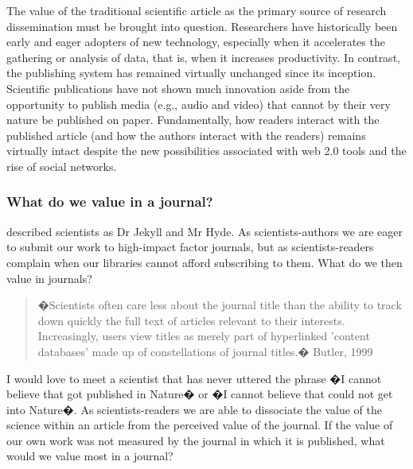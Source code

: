 \documentclass[final,authoryear,3p]{elsarticle-open-drafting}
\begin{document}
The value of the traditional scientific article as the primary source of research dissemination must be brought into question. 
Researchers have historically been early and eager adopters of new technology, especially when it accelerates the gathering or 
analysis of data, that is, when it increases productivity. In contrast, the publishing system has remained virtually unchanged since 
its inception. Scientific publications have not shown much innovation aside from the opportunity to publish media (e.g., audio and 
video) that cannot by their very nature be published on paper. Fundamentally, how readers interact with the published article 
(and how the authors interact with the readers) remains virtually intact despite the new possibilities associated with web 2.0 tools 
and the rise of social networks.

\subsubsection{What do we value in a journal?}

\citet{guedon2001ols} described scientists as Dr Jekyll and Mr Hyde. As scientists-authors we are eager to submit our work to high-impact factor journals, but as scientists-readers complain when our libraries cannot afford subscribing to them. What do we then value in journals?

\begin{quote}
�Scientists often care less about the journal title than the ability to track down quickly the full text of articles relevant to their interests. Increasingly, users view titles as merely part of hyperlinked 'content databases' made up of constellations of journal titles.� Butler, 1999
\end{quote}

I would love to meet a scientist that has never uttered the phrase �I cannot believe that got published in Nature� or �I cannot believe that could not get into Nature�. 
As scientists-readers we are able to dissociate the value of the science within an article from the perceived value of the journal. If the value of our own work was not measured by the journal in which it is published, what would we value most in a journal?
\end{document}

